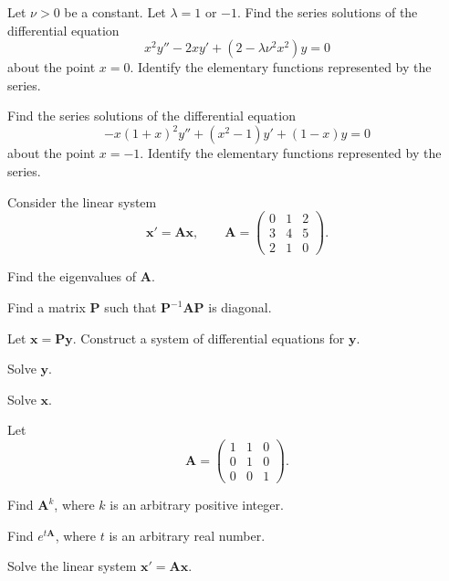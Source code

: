 \begin{problem}
Let $\nu>0$ be a constant. Let $\lambda=1$ or $-1$. Find the series solutions of the differential equation
\[
x^2y''-2xy'+(2-\lambda\nu^2x^2)y=0
\]
about the point $x=0$. Identify the elementary functions represented by the series.
\end{problem}

\begin{problem}
Find the series solutions of the differential equation
\[
-x(1+x)^2y''+(x^2-1)y'+(1-x)y=0
\]
about the point $x=-1$. Identify the elementary functions represented by the series.
\end{problem}

\begin{problem}
Consider the linear system
\[
\mathbf x'=\mathbf A\mathbf x,
\qquad
\mathbf A=
\begin{pmatrix}
0&1&2\\
3&4&5\\
2&1&0
\end{pmatrix}.
\]
\begin{problemsubparts}
\item Find the eigenvalues of $\mathbf A$.
\item Find a matrix $\mathbf P$ such that $\mathbf P^{-1}\mathbf A\mathbf P$ is diagonal.
\item Let $\mathbf x=\mathbf P\mathbf y$. Construct a system of differential equations for $\mathbf y$.
\item Solve $\mathbf y$.
\item Solve $\mathbf x$.
\end{problemsubparts}
\end{problem}

\begin{problem}
Let
\[
\mathbf A=
\begin{pmatrix}
1&1&0\\
0&1&0\\
0&0&1
\end{pmatrix}.
\]
\begin{problemsubparts}
\item Find $\mathbf A^k$, where $k$ is an arbitrary positive integer.
\item Find $e^{t\mathbf A}$, where $t$ is an arbitrary real number.
\item Solve the linear system $\mathbf x'=\mathbf A\mathbf x$.
\end{problemsubparts}
\end{problem}

